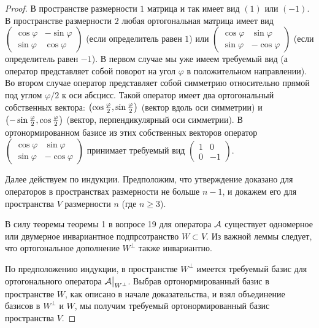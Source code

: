 \begin{proof}
    В пространстве размерности $1$ матрица и так имеет вид $(1)$ или $(-1)$. В пространстве размерности $2$ любая ортогональная матрица имеет вид
    $
    \begin{pmatrix}
        \cos\varphi & -\sin\varphi\\
        \sin\varphi & \cos\varphi
    \end{pmatrix}
    $ (если определитель равен $1$) или
    $
    \begin{pmatrix}
        \cos\varphi & \sin\varphi\\
        \sin\varphi & -\cos\varphi
    \end{pmatrix}
    $ (если определитель равен $-1$). В первом случае мы уже имеем требуемый вид (а оператор представляет собой поворот на угол $\varphi$ в положительном направлении). Во втором случае оператор представляет собой симметрию относительно прямой под углом $\varphi / 2$ к оси абсцисс. Такой оператор имеет два ортогональный собственных вектора: $\left(\cos\frac{\varphi}{2}, \sin\frac{\varphi}{2}\right)$ (вектор вдоль оси симметрии) и $\left(-\sin\frac{\varphi}{2}, \cos\frac{\varphi}{2}\right)$ (вектор, перпендикулярный оси симметрии). В ортонормированном базисе из этих собственных векторов оператор
    $
    \begin{pmatrix}
        \cos\varphi & \sin\varphi\\
        \sin\varphi & -\cos\varphi
    \end{pmatrix}
    $ принимает требуемый вид
    $
    \begin{pmatrix}
        1 & 0\\
        0 & -1
    \end{pmatrix}
    $.

    Далее действуем по индукции. Предположим, что утверждение доказано для операторов в пространствах размерности не больше $n - 1$, и докажем его для пространства $V$ размерности $n$ (где $n \geqslant 3$).

    В силу теоремы теоремы 1 в вопросе 19 для оператора $\mathcal{A}$ существует одномерное или двумерное инвариантное подпрсотранство $W \subset V$. Из важной леммы следует, что ортогональное дополнение $W^\perp$ также инвариантно.

    По предположению индукции, в пространстве $W^\perp$ имеется требуемый базис для ортогонального оператора $\mathcal{A}\big|_{W^\perp}$. Выбрав ортонормированный базис в пространстве $W$, как описано в начале доказательства, и взял объединение базисов в $W^\perp$ и $W$, мы получим требуемый ортонормированный базис пространства $V$.
\end{proof}


